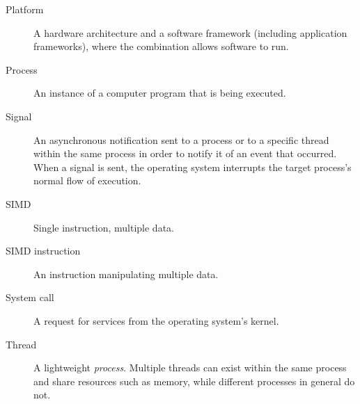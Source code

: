 \begin {description}
	\item [Platform] A hardware architecture and a software framework
		(including application frameworks), where the combination allows
		software to run.
	\item [Process] An instance of a computer program that is being executed.
	\item [Signal] An asynchronous notification sent to a process or to a
		specific thread within the same process in order to notify it of an
		event that occurred. When a signal is sent, the operating system
		interrupts the target process's normal flow of execution.
	\item [SIMD] Single instruction, multiple data.
	\item [SIMD instruction] An instruction manipulating multiple data.
	\item [System call] A request for services from the operating system's
		kernel.
	\item [Thread] A lightweight \emph{process}. Multiple threads can exist
		within the same process and share resources such as memory, while
		different processes in general do not.
\end {description}

